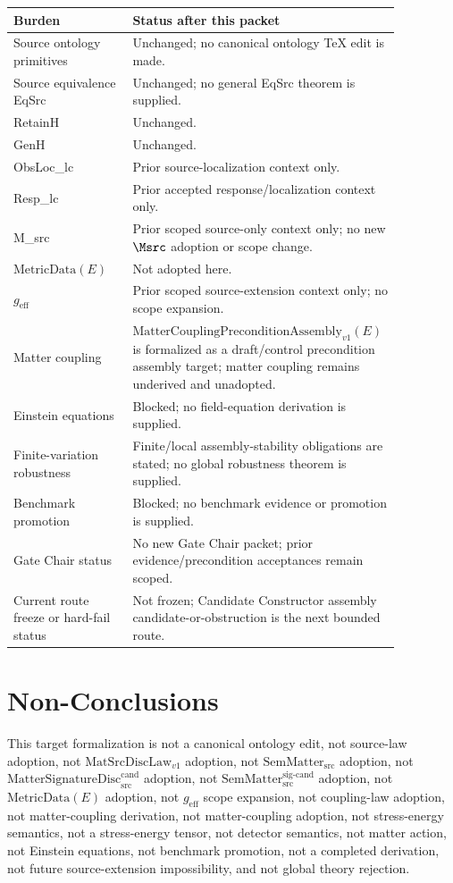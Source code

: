 \documentclass[11pt]{article}
\newcommand{\MetricData}{\mathrm{MetricData}}
\newcommand{\geff}{g_{\mathrm{eff}}}
\newcommand{\MatSrcDiscLaw}{\mathrm{MatSrcDiscLaw}_{v1}}
\newcommand{\SemMatterSrc}{\mathrm{SemMatter}_{\mathrm{src}}}
\newcommand{\SemMatterSig}{\mathrm{SemMatter}_{\mathrm{src}}^{\mathrm{sig\text{-}cand}}}
\newcommand{\MatSigDisc}{\mathrm{MatterSignatureDisc}_{\mathrm{src}}^{\mathrm{cand}}}
\newcommand{\MCPA}{\mathrm{MatterCouplingPreconditionAssembly}_{v1}}
\begin{document}
\begin{longtable}{p{0.30\linewidth}p{0.56\linewidth}}
\toprule
Burden & Status after this packet \\
\midrule
Source ontology primitives & Unchanged; no canonical ontology TeX edit is made. \\
Source equivalence EqSrc & Unchanged; no general EqSrc theorem is supplied. \\
RetainH & Unchanged. \\
GenH & Unchanged. \\
ObsLoc_lc & Prior source-localization context only. \\
Resp_lc & Prior accepted response/localization context only. \\
M_src & Prior scoped source-only context only; no new \(\Msrc\) adoption or scope change. \\
\(\MetricData(E)\) & Not adopted here. \\
\(\geff\) & Prior scoped source-extension context only; no scope expansion. \\
Matter coupling & \(\MCPA(E)\) is formalized as a draft/control precondition assembly target; matter coupling remains underived and unadopted. \\
Einstein equations & Blocked; no field-equation derivation is supplied. \\
Finite-variation robustness & Finite/local assembly-stability obligations are stated; no global robustness theorem is supplied. \\
Benchmark promotion & Blocked; no benchmark evidence or promotion is supplied. \\
Gate Chair status & No new Gate Chair packet; prior evidence/precondition acceptances remain scoped. \\
Current route freeze or hard-fail status & Not frozen; Candidate Constructor assembly candidate-or-obstruction is the next bounded route. \\
\bottomrule
\end{longtable}

\section{Non-Conclusions}

This target formalization is not a canonical ontology edit, not source-law
adoption, not \(\MatSrcDiscLaw\) adoption, not \(\SemMatterSrc\) adoption, not
\(\MatSigDisc\) adoption, not \(\SemMatterSig\) adoption, not
\(\MetricData(E)\) adoption, not \(\geff\) scope expansion, not coupling-law
adoption, not matter-coupling derivation, not matter-coupling adoption, not
stress-energy semantics, not a stress-energy tensor, not detector semantics,
not matter action, not Einstein equations, not benchmark promotion, not a
completed derivation, not future source-extension impossibility, and not
global theory rejection.
\end{document}
